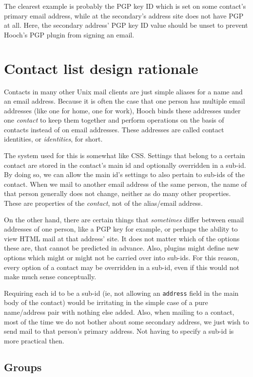 \documentclass[a4paper]{article}
\begin{document}
The clearest example is probably the PGP key ID which is set on some
contact's primary email address, while at the secondary's address site does
not have PGP at all.  Here, the secondary address' PGP key ID value
should be unset to prevent Hooch's PGP plugin from signing an email.


\section{Contact list design rationale}

Contacts in many other Unix mail clients are just simple aliases for a
name and an email address.  Because it is often the case that one
person has multiple email addresses (like one for home, one for work),
Hooch binds these addresses under one \emph{contact} to keep them together
and perform operations on the basis of contacts instead of on email
addresses.  These addresses are called contact identities, or
\emph{identities}, for short.

The system used for this is somewhat like CSS.  Settings that belong to a
certain contact are stored in the contact's main id and optionally
overridden in a sub-id.  By doing so, we can allow the main id's settings
to also pertain to sub-ids of the contact.  When we mail to another email
address of the same person, the name of that person generally does not
change, neither as do many other properties.  These are properties of
the \emph{contact}, not of the alias/email address.

On the other hand, there are certain things that \emph{sometimes} differ
between email addresses of one person, like a PGP key for example, or
perhaps the ability to view HTML mail at that address' site.  It does not
matter which of the options these are, that cannot be predicted in advance.
Also, plugins might define new options which might or might not be carried
over into sub-ids.  For this reason, every option of a contact may be
overridden in a sub-id, even if this would not make much sense conceptually.

Requiring each id to be a sub-id (ie, not allowing an \texttt{address}
field in the main body of the contact) would be irritating in the simple
case of a pure name/address pair with nothing else added.  Also, when
mailing to a contact, most of the time we do not bother about some
secondary address, we just wish to send mail to that person's primary
address.  Not having to specify a sub-id is more practical then.


\subsection{Groups}
\end{document}

